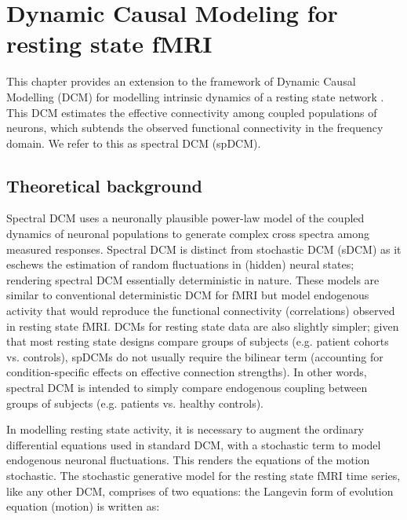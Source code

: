 \chapter{Dynamic Causal Modeling for resting state fMRI \label{Chap:DCM_rsfmri}}

This chapter provides an extension to the framework of Dynamic Causal Modelling (DCM) for modelling intrinsic dynamics of a resting state network \cite{rsDCM2014,rsDCM2015}. This DCM estimates the effective connectivity among coupled populations of neurons, which subtends the observed functional connectivity in the frequency domain. We refer to this as spectral DCM (spDCM).

\section{Theoretical background}
Spectral DCM uses a neuronally plausible power-law model of the coupled dynamics of neuronal populations to generate complex cross spectra among measured responses. Spectral DCM is distinct from stochastic DCM (sDCM) \cite{stocDCM2011} as it eschews the estimation of random fluctuations in (hidden) neural states; rendering spectral DCM essentially deterministic in nature. These models are similar to conventional deterministic DCM for fMRI \cite{dcm} but model endogenous activity that would reproduce the functional connectivity (correlations) observed in resting state fMRI. DCMs for resting state data are also slightly simpler; given that most resting state designs compare groups of subjects (e.g. patient cohorts vs. controls), spDCMs do not usually require the bilinear term (accounting for condition-specific effects on effective connection strengths). In other words, spectral DCM is intended to simply compare endogenous coupling between groups of subjects (e.g. patients vs. healthy controls).

In modelling resting state activity, it is necessary to augment the ordinary differential equations used in standard DCM, with a stochastic term to model endogenous neuronal fluctuations. This renders the equations of the motion stochastic. The stochastic generative model for the resting state fMRI time series, like any other DCM, comprises of two equations: the Langevin form of evolution equation (motion) is written as:

